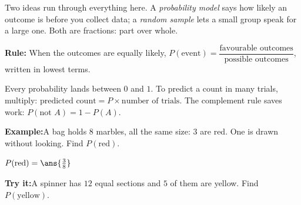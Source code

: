 \documentclass[12pt]{article}
\begin{document}

\noindent\small Two ideas run through everything here. A \emph{probability
model} says how likely an outcome is before you collect data; a \emph{random
sample} lets a small group speak for a large one. Both are fractions:
part over whole.\normalsize

\begin{formulabox}
\textbf{Rule:} When the outcomes are equally likely,
$P(\text{event}) = \dfrac{\text{favourable outcomes}}{\text{possible
outcomes}}$, written in lowest terms.\par
Every probability lands between $0$ and $1$. To predict a count in many trials,
multiply: $\text{predicted count} = P \times \text{number of trials}$. The
complement rule saves work: $P(\text{not } A) = 1 - P(A)$.
\end{formulabox}
\begin{examplebox}
\textbf{Example:}\quad A bag holds $8$ marbles, all the same size: $3$ are red.
One is drawn without looking. Find $P(\text{red})$.

$P(\text{red}) = \ans{\frac{3}{8}}$
\end{examplebox}
\begin{tryitbox}
\textbf{Try it:}\quad A spinner has $12$ equal sections and $5$ of them are
yellow. Find $P(\text{yellow})$.\\[2pt]
\end{tryitbox}
\end{document}

